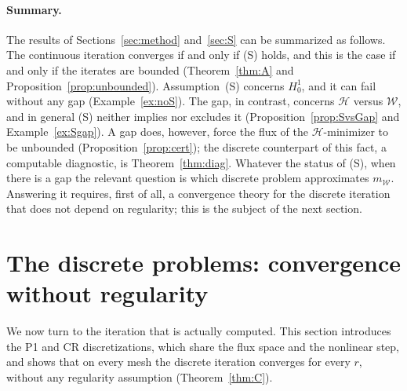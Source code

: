 \documentclass[11pt]{amsart}
\theoremstyle{definition}
\theoremstyle{remark}
\numberwithin{equation}{section}
\newcommand{\Wc}{\mathcal W}
\newcommand{\Hc}{\mathcal H}
\newcommand{\mW}{m_{\mathcal W}}
\begin{document}
\paragraph{Summary.} The results of Sections~\ref{sec:method} and~\ref{sec:S} can be summarized as follows. The continuous iteration converges if and only if (S) holds, and this is the case if and only if the iterates are bounded (Theorem~\ref{thm:A} and Proposition~\ref{prop:unbounded}). Assumption~(S) concerns $H^1_0$, and it can fail without any gap (Example~\ref{ex:noS}). The gap, in contrast, concerns $\Hc$ versus $\Wc$, and in general (S) neither implies nor excludes it (Proposition~\ref{prop:SvsGap} and Example~\ref{ex:Sgap}). A gap does, however, force the flux of the $\Hc$-minimizer to be unbounded (Proposition~\ref{prop:cert}); the discrete counterpart of this fact, a computable diagnostic, is Theorem~\ref{thm:diag}. Whatever the status of (S), when there is a gap the relevant question is which discrete problem approximates $\mW$. Answering it requires, first of all, a convergence theory for the discrete iteration that does not depend on regularity; this is the subject of the next section.


\section{The discrete problems: convergence without regularity}\label{sec:discrete}

We now turn to the iteration that is actually computed. This section introduces the P1 and CR discretizations, which share the flux space and the nonlinear step, and shows that on every mesh the discrete iteration converges for every $r$, without any regularity assumption (Theorem~\ref{thm:C}).
\end{document}
